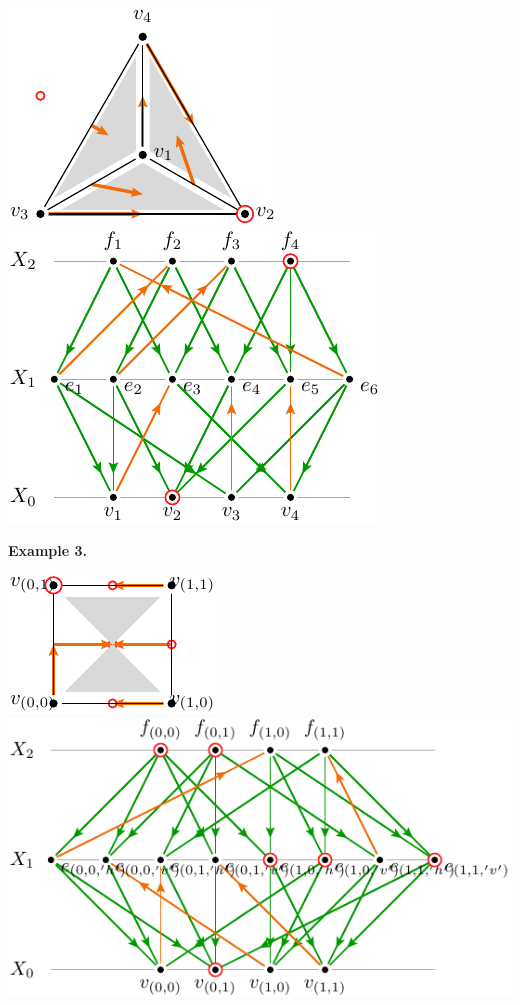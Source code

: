 \documentclass[11pt,oneside]{article}
\begin{document}
\begin{center}
\includegraphics[]{images/pic-complex-1}
\ \ \ \ \ \includegraphics[]{images/pic-poset-1}
\end{center}


\noindent
{\bf Example 3.}

\begin{center}
\includegraphics[]{images/pic-complex-2}
\ \ \ \ \ \includegraphics[]{images/pic-poset-2}
\end{center}



{}

\end{document}
